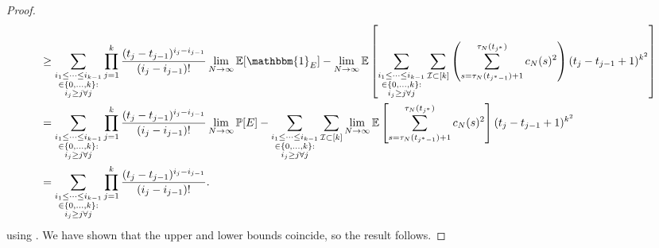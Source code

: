 \documentclass{article}
\newcommand{\Prob}{\mathbb{P}}
\newcommand{\E}{\mathbb{E}}
\newcommand{\1}[1]{\mathbbm{1}_{#1}}
\begin{document}
\begin{proof}
\begin{align}
&\geq \sum_{\substack{i_1\leq \dots\leq i_{k-1}\\ \in \{0,\dots,k\} :\\ i_j \geq j \forall j}}
\prod_{j=1}^k \frac{(t_j - t_{j-1})^{i_j - i_{j-1}}}{(i_j - i_{j-1})!}   
\lim_{N\to\infty}\E[\1{E}]
- \lim_{N\to\infty} \E \left[ \sum_{\substack{i_1\leq \dots\leq i_{k-1}\\ \in \{0,\dots,k\} :\\ i_j \geq j \forall j}}
\sum_{\mathcal{I} \subset [k]} 
\left( \sum_{s=\tau_N(t_{j^*-1})+1}^{\tau_N(t_{j^*})} c_N(s)^2 \right)
( t_j - t_{j-1} +1 )^{k^2} \right] \notag\\
&= \sum_{\substack{i_1\leq \dots\leq i_{k-1}\\ \in \{0,\dots,k\} :\\ i_j \geq j \forall j}}
\prod_{j=1}^k \frac{(t_j - t_{j-1})^{i_j - i_{j-1}}}{(i_j - i_{j-1})!}   
\lim_{N\to\infty}\Prob[E]
- \sum_{\substack{i_1\leq \dots\leq i_{k-1}\\ \in \{0,\dots,k\} :\\ i_j \geq j \forall j}}
\sum_{\mathcal{I} \subset [k]}
\lim_{N\to\infty} \E \left[ \sum_{s=\tau_N(t_{j^*-1})+1}^{\tau_N(t_{j^*})} c_N(s)^2 \right]
( t_j - t_{j-1} +1 )^{k^2} \notag\\
&= \sum_{\substack{i_1\leq \dots\leq i_{k-1}\\ \in \{0,\dots,k\} :\\ i_j \geq j \forall j}}
\prod_{j=1}^k \frac{(t_j - t_{j-1})^{i_j - i_{j-1}}}{(i_j - i_{j-1})!} .
\end{align}
using \citet[Equation (3.5)]{brown2021}.
We have shown that the upper and lower bounds coincide, so the result follows.
\end{proof}





\end{document}
